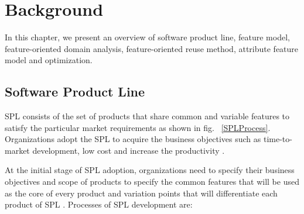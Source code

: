 \chapter{Background}
\label{chapter2}
\hspace*{0.4cm} 


In this chapter, we present an overview of software product line, feature model, feature-oriented domain analysis, feature-oriented reuse method, attribute feature model and optimization.

\section{Software Product Line}
SPL consists of the set of products that share common and variable features to satisfy the particular market requirements \cite{t40} as shown in fig. ~\ref{SPLProcess}. Organizations adopt the SPL to acquire the business objectives such as time-to-market development, low cost and increase the productivity \cite{t41, t42}.



At the initial stage of SPL adoption, organizations need to specify their business objectives and scope of products to specify the common features that will be used as the core of every product and variation points that will differentiate each product of SPL \cite{t43, t44, t45}. Processes of SPL development are:


